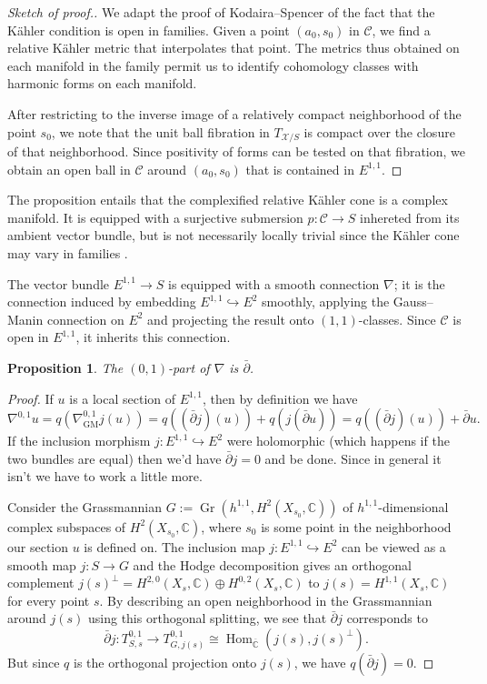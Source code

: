 \documentclass[11pt,a4paper]{amsart}
\newtheorem{prop}[theo]{Proposition}
\theoremstyle{definition}
\theoremstyle{remark}
\newcommand{\CC}{\mathbb{C}}
\def\ov#1{\overline{#1}}
\DeclareMathOperator{\Gr}{Gr}
\DeclareMathOperator{\Hom}{Hom}
\def\dbar{\bar\partial}
\def\cX{\mathcal{X}}
\def\conn{\nabla}
\def\conngm{\nabla_{\mathrm{GM}}}
\def\KC{C}
\def\RKC{\mathcal{\KC}}
\begin{document}
\begin{proof}[Sketch of proof.]
We adapt the proof of Kodaira--Spencer \cite{KodairaSpencerIII} of
the fact that the K\"{a}hler condition is open in families. Given a
point $(a_0,s_0)$ in $\RKC$, we find a relative K\"{a}hler metric that
interpolates that point. The metrics thus obtained on each manifold
in the family permit us to identify cohomology classes with harmonic
forms on each manifold.

After restricting to the inverse image of a relatively compact
neighborhood of the point $s_0$, we note that the unit ball
fibration in $T_{\cX/S}$ is compact over the closure of that
neighborhood. Since positivity of forms can be tested on that
fibration, we obtain an open ball in $\RKC$ around $(a_0,s_0)$
that is contained in $E^{1,1}$.
\end{proof}

The proposition entails that the complexified relative K\"{a}hler cone is
a complex manifold. It is equipped with a surjective submersion $p :
\RKC \to S$ inhereted from its ambient vector bundle, but is not
necessarily locally trivial since the K\"{a}hler cone may vary in
families
\cite{DemaillyPaun}.


The vector bundle $E^{1,1} \to S$ is equipped with a smooth connection
$\conn$; it is the connection induced by embedding $E^{1,1}
\hookrightarrow E^2$ smoothly, applying the Gauss--Manin connection on
$E^2$ and projecting the result onto $(1,1)$-classes. Since $\RKC$
is open in $E^{1,1}$, it inherits this connection.


\begin{prop}
The $(0,1)$-part of $\conn$ is $\dbar$.
\end{prop}


\begin{proof}
If $u$ is a local section of $E^{1,1}$, then by definition we have
$$
\conn^{0,1} u = q (\conngm^{0,1} j(u))
= q ((\dbar j) (u))
+ q (j(\dbar u))
= q ((\dbar j) (u))
+ \dbar u. 
$$
If the inclusion morphism $j : E^{1,1} \hookrightarrow E^2$ were
holomorphic (which happens if the two bundles are equal) then we'd have
$\dbar j = 0$ and be done.  Since in general it isn't we have to
work a little more.

Consider the Grassmannian $G := \Gr(h^{1,1}, H^2(X_{s_0},\CC))$ of
$h^{1,1}$-dimensional complex subspaces of $H^2(X_{s_0},\CC)$, where
$s_0$ is some point in the neighborhood our section $u$ is defined on.
The inclusion map $j : E^{1,1} \hookrightarrow E^2$ can be viewed as a
smooth map $j : S \to G$ and the Hodge decomposition gives an orthogonal
complement $j(s)^{\perp} = H^{2,0}(X_s, \CC) \oplus H^{0,2}(X_s, \CC)$ to
$j(s) = H^{1,1}(X_s, \CC)$ for every point $s$. By describing an open
neighborhood in the Grassmannian around $j(s)$ using this orthogonal
splitting, we see that $\dbar j$ corresponds to
$$
\dbar j : T_{S,s}^{0,1}
\to 
T_{G, j(s)}^{0,1}
\cong
\Hom_{\ov{\CC}}(j(s), j(s)^{\perp}).
$$
But since $q$ is the orthogonal projection onto $j(s)$, we have
$q(\dbar j) = 0$.
\end{proof}
\end{document}
